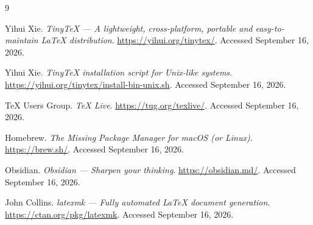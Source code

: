 \documentclass[11pt]{article}
\begin{document}
\begin{thebibliography}{9}

Yihui Xie. \emph{TinyTeX --- A lightweight, cross-platform, portable and easy-to-maintain LaTeX distribution}. \url{https://yihui.org/tinytex/}. Accessed September 16, 2026.

Yihui Xie. \emph{TinyTeX installation script for Unix-like systems}. \url{https://yihui.org/tinytex/install-bin-unix.sh}. Accessed September 16, 2026.

TeX Users Group. \emph{TeX Live}. \url{https://tug.org/texlive/}. Accessed September 16, 2026.

Homebrew. \emph{The Missing Package Manager for macOS (or Linux)}. \url{https://brew.sh/}. Accessed September 16, 2026.

Obsidian. \emph{Obsidian --- Sharpen your thinking}. \url{https://obsidian.md/}. Accessed September 16, 2026.

John Collins. \emph{latexmk --- Fully automated LaTeX document generation}. \url{https://ctan.org/pkg/latexmk}. Accessed September 16, 2026.

\end{thebibliography}
\end{document}
